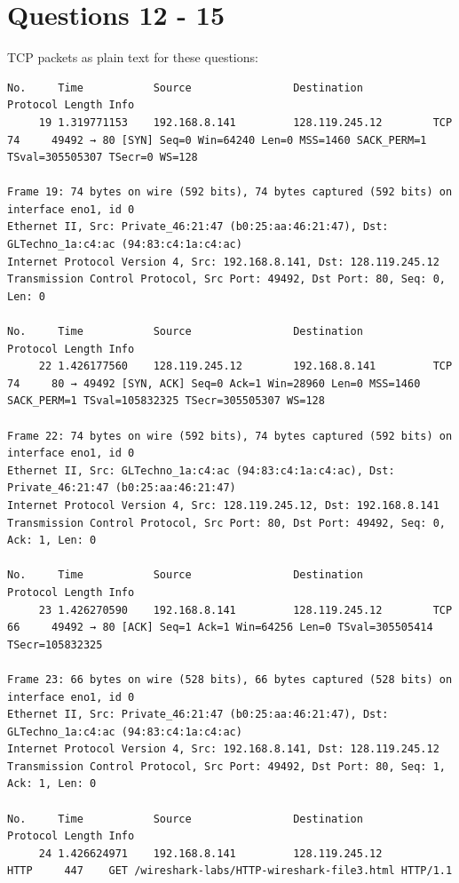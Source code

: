 \documentclass[a4paper,11pt,final]{report}
\begin{document}
\chapter{Questions 12 - 15}

TCP packets as plain text for these questions:
\begin{lstlisting}[breaklines]
No.     Time           Source                Destination           Protocol Length Info
     19 1.319771153    192.168.8.141         128.119.245.12        TCP      74     49492 → 80 [SYN] Seq=0 Win=64240 Len=0 MSS=1460 SACK_PERM=1 TSval=305505307 TSecr=0 WS=128

Frame 19: 74 bytes on wire (592 bits), 74 bytes captured (592 bits) on interface eno1, id 0
Ethernet II, Src: Private_46:21:47 (b0:25:aa:46:21:47), Dst: GLTechno_1a:c4:ac (94:83:c4:1a:c4:ac)
Internet Protocol Version 4, Src: 192.168.8.141, Dst: 128.119.245.12
Transmission Control Protocol, Src Port: 49492, Dst Port: 80, Seq: 0, Len: 0

No.     Time           Source                Destination           Protocol Length Info
     22 1.426177560    128.119.245.12        192.168.8.141         TCP      74     80 → 49492 [SYN, ACK] Seq=0 Ack=1 Win=28960 Len=0 MSS=1460 SACK_PERM=1 TSval=105832325 TSecr=305505307 WS=128

Frame 22: 74 bytes on wire (592 bits), 74 bytes captured (592 bits) on interface eno1, id 0
Ethernet II, Src: GLTechno_1a:c4:ac (94:83:c4:1a:c4:ac), Dst: Private_46:21:47 (b0:25:aa:46:21:47)
Internet Protocol Version 4, Src: 128.119.245.12, Dst: 192.168.8.141
Transmission Control Protocol, Src Port: 80, Dst Port: 49492, Seq: 0, Ack: 1, Len: 0

No.     Time           Source                Destination           Protocol Length Info
     23 1.426270590    192.168.8.141         128.119.245.12        TCP      66     49492 → 80 [ACK] Seq=1 Ack=1 Win=64256 Len=0 TSval=305505414 TSecr=105832325

Frame 23: 66 bytes on wire (528 bits), 66 bytes captured (528 bits) on interface eno1, id 0
Ethernet II, Src: Private_46:21:47 (b0:25:aa:46:21:47), Dst: GLTechno_1a:c4:ac (94:83:c4:1a:c4:ac)
Internet Protocol Version 4, Src: 192.168.8.141, Dst: 128.119.245.12
Transmission Control Protocol, Src Port: 49492, Dst Port: 80, Seq: 1, Ack: 1, Len: 0

No.     Time           Source                Destination           Protocol Length Info
     24 1.426624971    192.168.8.141         128.119.245.12        HTTP     447    GET /wireshark-labs/HTTP-wireshark-file3.html HTTP/1.1 


\end{lstlisting}
\end{document}

